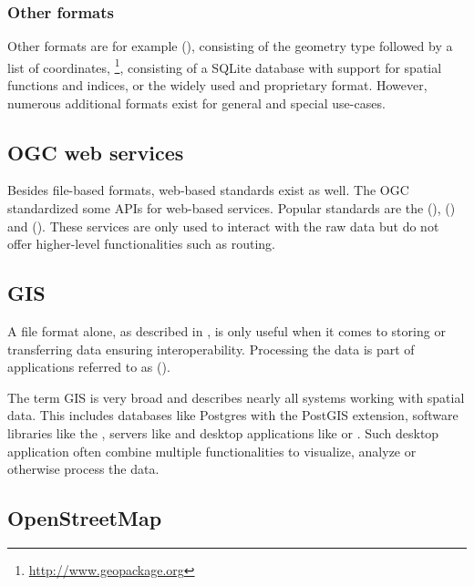 		\subsubsection{Other formats}
		\label{subsubsec:other-formats}
		
			Other formats are for example  (), consisting of the geometry type followed by a list of coordinates\cite[51]{ogc-sfa}, \footnote{\url{http://www.geopackage.org}}, consisting of a SQLite database with support for spatial functions and indices, or the widely used and proprietary  format\cite{esri-shapefile-spec}.
			However, numerous additional formats exist for general and special use-cases.
			
	\subsection{OGC web services}
	
		Besides file-based formats, web-based standards exist as well.
		The OGC standardized some APIs for web-based services.
		Popular standards are the  (),  () and  ().
		These services are only used to interact with the raw data but do not offer higher-level functionalities such as routing.
	
	\subsection{GIS}
	
		A file format alone, as described in , is only useful when it comes to storing or transferring data ensuring interoperability.
		Processing the data is part of applications referred to as  ().
		
		The term GIS is very broad and describes nearly all systems working with spatial data.
		This includes databases like Postgres with the PostGIS extension, software libraries like the , servers like  and desktop applications like  or .
		Such desktop application often combine multiple functionalities to visualize, analyze or otherwise process the data.
	
	\subsection{OpenStreetMap}
	\label{subsec:osm}
	
